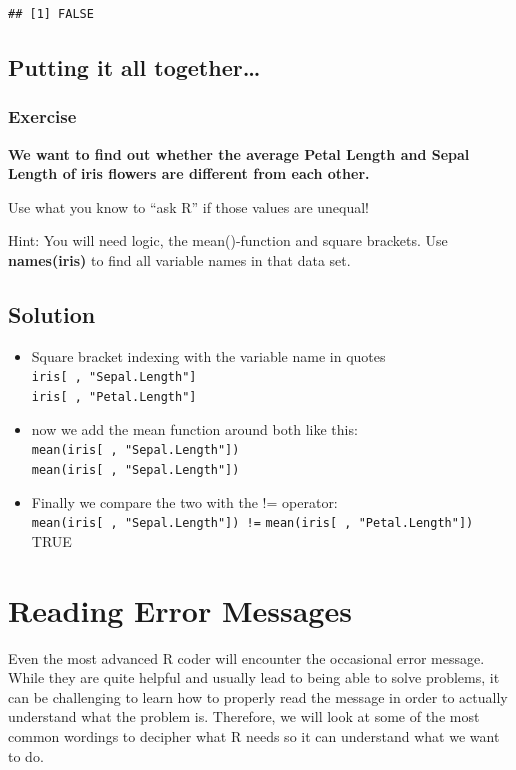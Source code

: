 \documentclass[
]{book}
\providecommand{\tightlist}{%
  \setlength{\itemsep}{0pt}\setlength{\parskip}{0pt}}
\begin{document}
\begin{verbatim}
## [1] FALSE
\end{verbatim}

\subsection{Putting it all together\ldots{}}\label{putting-it-all-together}

\subsubsection{Exercise}\label{exercise-1}

\textbf{We want to find out whether the average Petal Length and Sepal Length of iris flowers are different from each other.}

Use what you know to ``ask R'' if those values are unequal!

Hint: You will need logic, the mean()-function and square brackets. Use \textbf{names(iris)} to find all variable names in that data set.

\subsection{Solution}\label{solution-1}

\begin{itemize}
\tightlist
\item
  Square bracket indexing with the variable name in quotes \newline
  \texttt{iris{[}\ ,\ "Sepal.Length"{]}}\\
  \texttt{iris{[}\ ,\ "Petal.Length"{]}}
\item
  now we add the mean function around both like this:
  \texttt{mean(iris{[}\ ,\ "Sepal.Length"{]})}\\
  \texttt{mean(iris{[}\ ,\ "Sepal.Length"{]})}
\item
  Finally we compare the two with the != operator:
  \texttt{mean(iris{[}\ ,\ "Sepal.Length"{]})\ !=}
  \texttt{mean(iris{[}\ ,\ "Petal.Length"{]})}\\
  TRUE
\end{itemize}

\section{Reading Error Messages}\label{reading-error-messages}

Even the most advanced R coder will encounter the occasional error message.
While they are quite helpful and usually lead to being able to solve problems, it can be challenging to learn how to properly read the message in order to actually understand what the problem is.
Therefore, we will look at some of the most common wordings to decipher what R needs so it can understand what we want to do.
\end{document}
